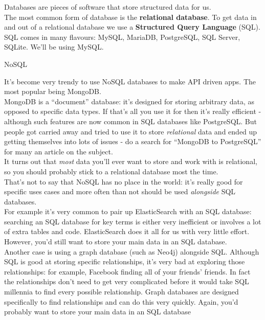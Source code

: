 Databases are pieces of software that store structured data for us.
\\

The most common form of database is the \textbf{relational database}. To get data in and out of a relational database we use a \textbf{Structured Query Language} (SQL).
\\

SQL comes in many flavours: MySQL, MariaDB, PostgreSQL, SQL Server, SQLite. We'll be using MySQL.


\begin{infobox}{NoSQL}

    It's become very trendy to use NoSQL databases to make API driven apps. The most popular being MongoDB.
    \\

    MongoDB is a ``document'' database: it's designed for storing arbitrary data, as opposed to specific data types. If that's all you use it for then it's really efficient - although such features are now common in SQL databases like PostgreSQL. But people got carried away and tried to use it to store \textit{relational} data and ended up getting themselves into lots of issues - do a search for ``MongoDB to PostgreSQL'' for many an article on the subject.
    \\

    It turns out that \textit{most} data you'll ever want to store and work with is relational, so you should probably stick to a relational database most the time.
    \\

    That's not to say that NoSQL has no place in the world: it's really good for specific uses cases and more often than not should be used \textit{alongside} SQL databases.
    \\

    For example it's very common to pair up ElasticSearch with an SQL database: searching an SQL database for key terms is either very inefficient or involves a lot of extra tables and code. ElasticSearch does it all for us with very little effort. However, you'd still want to store your main data in an SQL database.
    \\

    Another case is using a graph database (such as Neo4j) alongside SQL. Although SQL is good at storing specific relationships, it's very bad at exploring those relationships: for example, Facebook finding all of your friends' friends. In fact the relationships don't need to get very complicated before it would take SQL millennia to find every possible relationship. Graph databases are designed specifically to find relationships and can do this very quickly. Again, you'd probably want to store your main data in an SQL database
\end{infobox}



